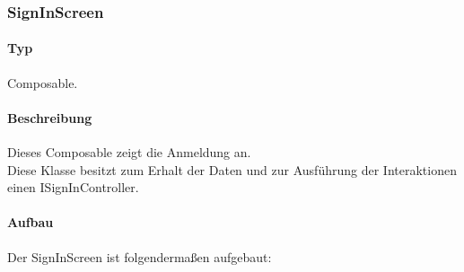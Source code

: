 \subsubsection{SignInScreen}
\paragraph*{Typ}
Composable.
\paragraph*{Beschreibung}
Dieses Composable zeigt die Anmeldung an.\\
Diese Klasse besitzt zum Erhalt der Daten und zur Ausführung der Interaktionen einen ISignInController.

\paragraph*{Aufbau}
Der SignInScreen ist folgendermaßen aufgebaut:
